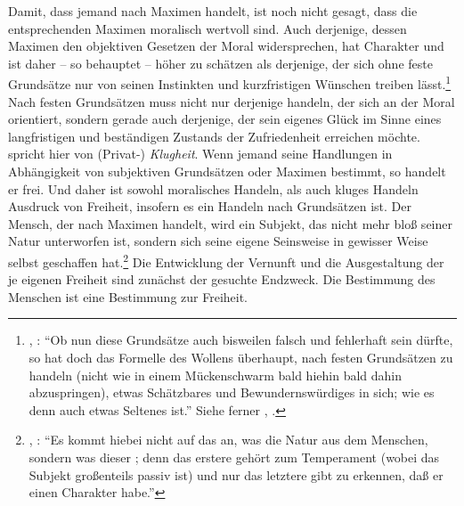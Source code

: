 Damit, dass jemand nach Maximen handelt, ist noch nicht gesagt, dass die
entsprechenden Maximen moralisch wertvoll sind. Auch derjenige, dessen Maximen den objektiven
Gesetzen der Moral widersprechen, hat Charakter und ist daher -- so behauptet
 -- höher zu schätzen als derjenige, der sich ohne feste
Grundsätze nur von seinen Instinkten und kurzfristigen Wünschen treiben
lässt.\footnote{\cite[Vgl.][A~266]{Kant:AnthropologieinpragmatischerHinsicht1977},
\cite[VII: 292.10--14]{Kant:GesammelteWerke1900ff.}: \enquote{Ob nun diese
Grundsätze auch bisweilen falsch und fehlerhaft sein dürfte, so hat doch das
Formelle des Wollens überhaupt, nach festen Grundsätzen zu handeln (nicht wie in
einem Mückenschwarm bald hiehin bald dahin abzuspringen), etwas Schätzbares und
Bewundernswürdiges in sich; wie es denn auch etwas Seltenes ist.} Siehe ferner
\cite[][A~269]{Kant:AnthropologieinpragmatischerHinsicht1977}, \cite[VII:
293.14--23]{Kant:GesammelteWerke1900ff.}.} 
Nach festen Grundsätzen muss nicht nur derjenige handeln, der sich an der Moral
orientiert, sondern gerade auch derjenige, der sein eigenes Glück im Sinne eines
langfristigen und beständigen Zustands der Zufriedenheit erreichen
möchte.  spricht hier von (Privat-) \emph{Klugheit}. Wenn jemand
seine Handlungen in Abhängigkeit von subjektiven Grundsätzen oder Maximen
bestimmt, so handelt er frei. Und daher ist sowohl moralisches Handeln, als auch
kluges Handeln Ausdruck von Freiheit, insofern es ein Handeln nach Grundsätzen
ist. Der Mensch, der nach Maximen handelt, wird ein Subjekt, das nicht mehr bloß
seiner Natur unterworfen ist, sondern sich seine eigene
Seinsweise in gewisser Weise selbst geschaffen hat.\footnote{\cite[Vgl.][A
267]{Kant:AnthropologieinpragmatischerHinsicht1977}, \cite[VII:
292.15--18]{Kant:GesammelteWerke1900ff.}: \enquote{Es kommt hiebei nicht auf das
an, was die Natur aus dem Menschen, sondern was dieser ; denn das erstere gehört zum Temperament (wobei das Subjekt großenteils
passiv ist) und nur das letztere gibt zu erkennen, daß er einen Charakter
habe.}} Die Entwicklung der Vernunft und die Ausgestaltung der je eigenen
Freiheit sind zunächst der gesuchte Endzweck. Die Bestimmung des Menschen ist
eine Bestimmung zur Freiheit.

